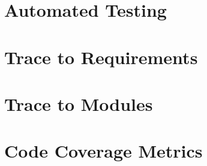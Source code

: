 \documentclass[12pt, titlepage]{article}
\begin{document}
\section{Automated Testing}
		
\section{Trace to Requirements}
		
\section{Trace to Modules}		

\section{Code Coverage Metrics}




\end{document}
